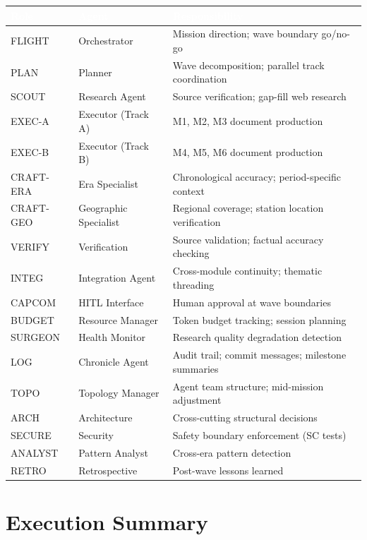 \documentclass[11pt,letterpaper]{article}
\newcommand{\tableheader}[1]{\textbf{\sffamily\textcolor{white}{#1}}}
\begin{document}
\begin{center}
\begin{tabularx}{\textwidth}{L{2cm}L{2.5cm}X}
\toprule
{}
\tableheader{Role} & \tableheader{Agent} & \tableheader{Responsibility} \\
\midrule
FLIGHT & Orchestrator & Mission direction; wave boundary go/no-go \\
PLAN & Planner & Wave decomposition; parallel track coordination \\
SCOUT & Research Agent & Source verification; gap-fill web research \\
EXEC-A & Executor (Track A) & M1, M2, M3 document production \\
EXEC-B & Executor (Track B) & M4, M5, M6 document production \\
CRAFT-ERA & Era Specialist & Chronological accuracy; period-specific context \\
CRAFT-GEO & Geographic Specialist & Regional coverage; station location verification \\
VERIFY & Verification & Source validation; factual accuracy checking \\
INTEG & Integration Agent & Cross-module continuity; thematic threading \\
CAPCOM & HITL Interface & Human approval at wave boundaries \\
BUDGET & Resource Manager & Token budget tracking; session planning \\
SURGEON & Health Monitor & Research quality degradation detection \\
LOG & Chronicle Agent & Audit trail; commit messages; milestone summaries \\
TOPO & Topology Manager & Agent team structure; mid-mission adjustment \\
ARCH & Architecture & Cross-cutting structural decisions \\
SECURE & Security & Safety boundary enforcement (SC tests) \\
ANALYST & Pattern Analyst & Cross-era pattern detection \\
RETRO & Retrospective & Post-wave lessons learned \\
\bottomrule
\end{tabularx}
\end{center}

\section{Execution Summary}
\end{document}
